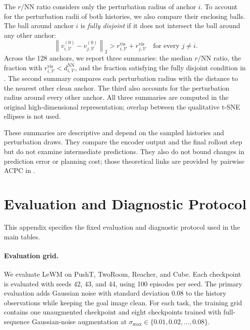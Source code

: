 \documentclass[10pt]{article}
\newcommand{\stdmax}{\ensuremath{\sigma_{\max}}}
\begin{document}
The $r/\mathrm{NN}$ ratio considers only the perturbation radius of anchor
$i$. To account for the perturbation radii of both histories, we also compare
their enclosing balls. The ball around anchor $i$ is \emph{fully disjoint} if
it does not intersect the ball around any other anchor:
\begin{equation}
\left\|v_{i,\mathcal V}^{(0)}-v_{j,\mathcal V}^{(0)}\right\|_2
>
r_{i,\mathcal V}^{\mathrm{vis}}+r_{j,\mathcal V}^{\mathrm{vis}}
\quad\text{for every }j\neq i.
\label{eq:local-cloud-disjoint}
\end{equation}
Across the 128 anchors, we report three summaries: the median
$r/\mathrm{NN}$ ratio, the fraction with
$r_{i,\mathcal V}^{\mathrm{vis}}<d_{i,\mathcal V}^{\mathrm{NN}}$, and the
fraction satisfying the fully disjoint condition in
. The second summary compares each perturbation
radius with the distance to the nearest other clean anchor. The third also
accounts for the perturbation radius around every other anchor. All three
summaries are computed in the original high-dimensional representation;
overlap between the qualitative t-SNE ellipses is not used.

These summaries are descriptive and depend on the sampled histories and
perturbation draws. They compare the encoder output and the final rollout step
but do not examine intermediate predictions. They also do not bound changes
in prediction error or planning cost; those theoretical links are provided by
pairwise ACPC in .

\section{Evaluation and Diagnostic Protocol}\label{sec:appendix-A}

This appendix specifies the fixed evaluation and diagnostic protocol used in
the main tables.

\paragraph{Evaluation grid.}
We evaluate LeWM on PushT, TwoRoom, Reacher, and Cube. Each checkpoint is
evaluated with seeds 42, 43, and 44, using 100 episodes per seed. The primary
evaluation adds Gaussian noise with standard deviation $0.08$ to the history
observations while keeping the goal image clean. For each task, the training
grid contains one unaugmented checkpoint and eight checkpoints trained with
full-sequence Gaussian-noise augmentation at
$\stdmax{}\in\{0.01,0.02,\ldots,0.08\}$.
\end{document}
